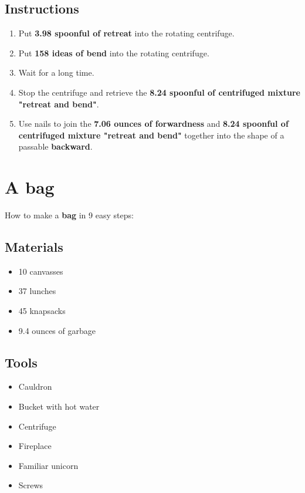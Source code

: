 \documentclass{article}
\begin{document}
\subsection{Instructions}\begin{enumerate}
\item 
Put \textbf{3.98 spoonful of retreat} into the rotating centrifuge.
\item 
Put \textbf{158 ideas of bend} into the rotating centrifuge.
\item 
Wait for a long time.
\item 
Stop the centrifuge and retrieve the \textbf{8.24 spoonful of centrifuged mixture "retreat and bend"}.
\item 
Use nails to join the \textbf{7.06 ounces of forwardness} and \textbf{8.24 spoonful of centrifuged mixture "retreat and bend"} together into the shape of a passable \textbf{backward}.
\end{enumerate}
\newpage
\section{A bag}How to make a \textbf{bag} in 9 easy steps:

\subsection{Materials}\begin{itemize}
\item 
10 canvasses
\item 
37 lunches
\item 
45 knapsacks
\item 
9.4 ounces of garbage
\end{itemize}
\subsection{Tools}\begin{itemize}
\item 
Cauldron
\item 
Bucket with hot water
\item 
Centrifuge
\item 
Fireplace
\item 
Familiar unicorn
\item 
Screws
\end{itemize}
\end{document}
